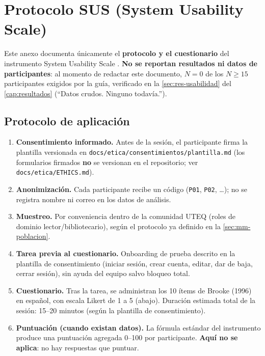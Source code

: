 \section{Protocolo SUS (System Usability Scale)}

Este anexo documenta únicamente el \textbf{protocolo y el cuestionario}
del instrumento System Usability Scale \citep{brooke1996sus}.
\textbf{No se reportan resultados ni datos de participantes}: al momento
de redactar este documento, $N=0$ de los $N\geq15$ participantes exigidos
por la guía, verificado en la \autoref{sec:res-usabilidad} del
\autoref{cap:resultados} (``Datos crudos. Ninguno todavía.'').

\subsection{Protocolo de aplicación}

\begin{enumerate}[leftmargin=1.2cm]
  \item \textbf{Consentimiento informado.} Antes de la sesión, el
    participante firma la plantilla versionada en
    \texttt{docs/etica/consentimientos/plantilla.md} (los formularios
    firmados \textbf{no} se versionan en el repositorio; ver
    \texttt{docs/etica/ETHICS.md}).
  \item \textbf{Anonimización.} Cada participante recibe un código
    (\texttt{P01}, \texttt{P02}, \ldots); no se registra nombre ni
    correo en los datos de análisis.
  \item \textbf{Muestreo.} Por conveniencia dentro de la comunidad UTEQ
    (roles de dominio lector/bibliotecario), según el protocolo ya
    definido en la \autoref{sec:mm-poblacion}.
  \item \textbf{Tarea previa al cuestionario.} Onboarding de prueba
    descrito en la plantilla de consentimiento (iniciar sesión, crear
    cuenta, editar, dar de baja, cerrar sesión), sin ayuda del equipo
    salvo bloqueo total.
  \item \textbf{Cuestionario.} Tras la tarea, se administran los 10
    ítems de Brooke (1996) en español, con escala Likert de 1 a 5
    (abajo). Duración estimada total de la sesión: 15--20 minutos
    (según la plantilla de consentimiento).
  \item \textbf{Puntuación (cuando existan datos).} La fórmula estándar
    del instrumento produce una puntuación agregada 0--100 por
    participante. \textbf{Aquí no se aplica}: no hay respuestas que
    puntuar.
\end{enumerate}

